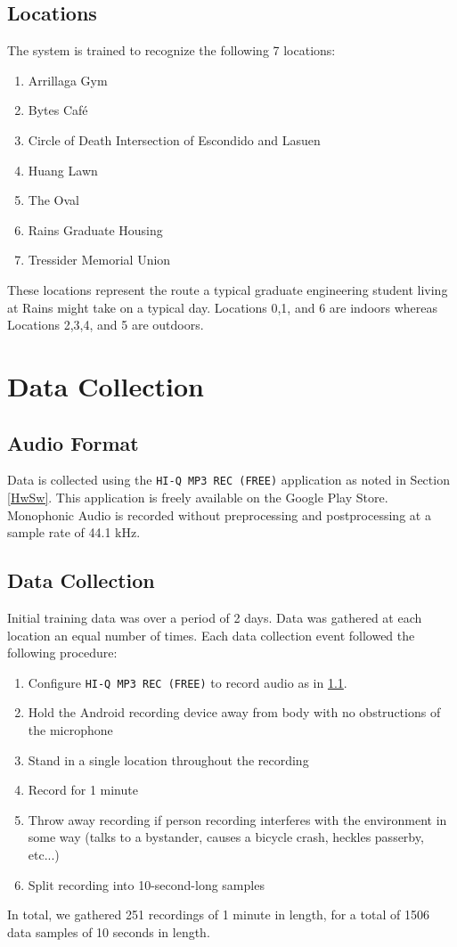 \documentclass[journal]{IEEEtran}
\begin{document}
\subsection{Locations}
The system is trained to recognize the following 7 locations:
\begin{enumerate}[label=\arabic*.]
\addtocounter{enumi}{-1}
\item Arrillaga Gym
\item Bytes Caf\'e
\item Circle of Death
    \subitem Intersection of Escondido and Lasuen
\item Huang Lawn
\item The Oval
\item Rains Graduate Housing
\item Tressider Memorial Union
\end{enumerate}
These locations represent the route a typical graduate engineering student living at Rains might take on a typical day. Locations 0,1, and 6 are indoors whereas Locations 2,3,4, and 5 are outdoors.


\section{Data Collection}\label{Data}
\subsection{Audio Format}\label{AudioFormat}
Data is collected using the \texttt{HI-Q MP3 REC (FREE)} application as noted in Section \ref{HwSw}. This application is freely available on the Google Play Store. Monophonic Audio is recorded without preprocessing and postprocessing at a sample rate of 44.1 kHz.
\subsection{Data Collection}
Initial training data was over a period of 2 days. Data was gathered at each location an equal number of times. Each data collection event followed the following procedure:
\begin{enumerate}
\item Configure \texttt{HI-Q MP3 REC (FREE)} to record audio as in \ref{AudioFormat}.
\item Hold the Android recording device away from body with no obstructions of the microphone
\item Stand in a single location throughout the recording
\item Record for 1 minute
\item Throw away recording if person recording interferes with the environment in some way (talks to a bystander, causes a bicycle crash, heckles passerby, etc...) 
\item Split recording into 10-second-long samples
\end{enumerate}
In total, we gathered 251 recordings of 1 minute in length, for a total of 1506 data samples of 10 seconds in length. 
\end{document}
